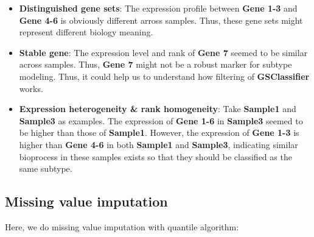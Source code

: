 \documentclass[
  12pt,
]{book}
\begin{document}
\begin{itemize}
\item
  \textbf{Distinguished gene sets}: The expression profile between \textbf{Gene 1-3} and \textbf{Gene 4-6} is obviously different arross samples. Thus, these gene sets might represent different biology meaning.
\item
  \textbf{Stable gene}: The expression level and rank of \textbf{Gene 7} seemed to be similar across samples. Thus, \textbf{Gene 7} might not be a robust marker for subtype modeling. Thus, it could help us to understand how filtering of \textbf{GSClassifier} works.
\item
  \textbf{Expression heterogeneity \& rank homogeneity}: Take \textbf{Sample1} and \textbf{Sample3} as examples. The expression of \textbf{Gene 1-6} in \textbf{Sample3} seemed to be higher than those of \textbf{Sample1}. However, the expression of \textbf{Gene 1-3} is higher than \textbf{Gene 4-6} in both \textbf{Sample1} and \textbf{Sample3}, indicating similar bioprocess in these samples exists so that they should be classified as the same subtype.
\end{itemize}

\hypertarget{missing-value-imputation}{%
\subsection{Missing value imputation}\label{missing-value-imputation}}

Here, we do missing value imputation with quantile algorithm:
\end{document}
